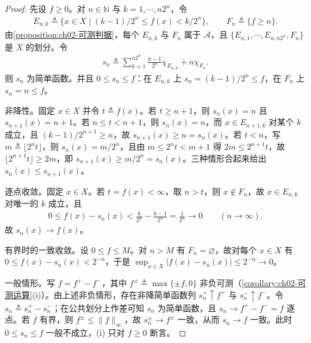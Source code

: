 \documentclass[../../main.tex]{subfiles}%
\begin{document}
\begin{proof}
先设 $f\geqslant0$。对 $n\in\mathbb{N}$ 与 $k=1,\cdots,n2^n$，令
\begin{align*}
E_{n,k}\triangleq\{x\in X\mid (k-1)/2^n\leqslant f(x)<k/2^n\},\qquad
F_n\triangleq\{f\geqslant n\}.
\end{align*}
由\cref{proposition:ch02-可测判据}，每个 $E_{n,k}$ 与 $F_n$ 属于 $\mathscr A$，且 $\{E_{n,1},\cdots,E_{n,n2^n},F_n\}$ 是 $X$ 的划分。令
\begin{align*}
s_n\triangleq\sum_{k=1}^{n2^n}\frac{k-1}{2^n}\chi_{E_{n,k}}+n\chi_{F_n}.
\end{align*}
则 $s_n$ 为简单函数。并且 $0\leqslant s_n\leqslant f$：在 $E_{n,k}$ 上 $s_n=(k-1)/2^n\leqslant f$，在 $F_n$ 上 $s_n=n\leqslant f$。

非降性。固定 $x\in X$ 并令 $t\triangleq f(x)$。若 $t\geqslant n+1$，则 $s_n(x)=n$ 且 $s_{n+1}(x)=n+1$。若 $n\leqslant t<n+1$，则 $s_n(x)=n$，而 $x\in E_{n+1,k}$ 对某个 $k$ 成立，且 $(k-1)/2^{n+1}\geqslant n$，故 $s_{n+1}(x)\geqslant n=s_n(x)$。若 $t<n$，写 $m\triangleq\lfloor2^nt\rfloor$，则 $s_n(x)=m/2^n$，且由 $m\leqslant2^nt<m+1$ 得 $2m\leqslant2^{n+1}t$，故 $\lfloor2^{n+1}t\rfloor\geqslant2m$，即 $s_{n+1}(x)\geqslant m/2^n=s_n(x)$。三种情形合起来给出 $s_n(x)\leqslant s_{n+1}(x)$。

逐点收敛。固定 $x\in X$。若 $t=f(x)<\infty$，取 $n>t$，则 $x\notin F_n$，故 $x\in E_{n,k}$ 对唯一的 $k$ 成立，且
\begin{align*}
0\leqslant f(x)-s_n(x)<\frac{k}{2^n}-\frac{k-1}{2^n}=\frac1{2^n}\to0\qquad(n\to\infty).
\end{align*}
故 $s_n(x)\to f(x)$。

有界时的一致收敛。设 $0\leqslant f\leqslant M$。对 $n>M$ 有 $F_n=\varnothing$，故对每个 $x\in X$ 有 $0\leqslant f(x)-s_n(x)<2^{-n}$，于是 $\sup_{x\in X}|f(x)-s_n(x)|\leqslant2^{-n}\to0$。

一般情形。写 $f=f^+-f^-$，其中 $f^\pm\triangleq\max\{\pm f,0\}$ 非负可测（\cref{corollary:ch02-可测运算}(i)）。由上述非负情形，存在非降简单函数列 $s_n^+\uparrow f^+$ 与 $s_n^-\uparrow f^-$。令 $s_n\triangleq s_n^+-s_n^-$；在公共划分上作差可知 $s_n$ 为简单函数，且 $s_n\to f^+ -f^-=f$ 逐点。若 $f$ 有界，则 $f^\pm\leqslant\|f\|_\infty$，故 $s_n^\pm\to f^\pm$ 一致，从而 $s_n\to f$ 一致。此时 $0\leqslant s_n\leqslant f$ 一般不成立，(i) 只对 $f\geqslant0$ 断言。
\end{proof}
\end{document}
